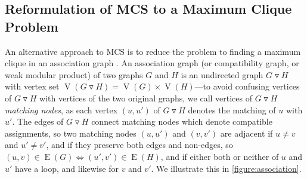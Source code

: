 \documentclass{llncs}
\newcommand{\modularproduct}{\operatorname{\triangledown}}
\begin{document}
\subsection{Reformulation of MCS to a Maximum Clique Problem}\label{clique}

An alternative approach to MCS is to reduce the problem to finding a maximum clique in an
association graph \cite{LeviG,bala86,dura99,DBLP:journals/jcamd/RaymondW02a}.
An association graph (or compatibility graph, or weak modular product) of two graphs $G$ and $H$ is
an undirected graph $G \modularproduct H$ with vertex set $\operatorname{V}(G \modularproduct H) =
\operatorname{V}(G) \times \operatorname{V}(H)$---to avoid confusing vertices of $G \modularproduct
H$ with vertices of the two original graphs, we call vertices of $G \modularproduct H$
\emph{matching nodes}, as each vertex $(u, u')$ of $G \modularproduct H$ denotes the matching of $u$
with $u'$. The edges of $G \modularproduct H$ connect matching nodes which denote compatible
assignments, so two matching nodes $(u, u')$ and  $(v, v')$ are adjacent if $u \neq v$ and $u' \neq
v'$, and if they preserve both edges and non-edges, so $(u, v) \in \operatorname{E}(G)
\Leftrightarrow (u', v') \in \operatorname{E}(H)$, and if either both or neither of $u$ and $u'$
have a loop, and likewise for $v$ and $v'$. We illustrate this in \cref{figure:association}.
\end{document}

